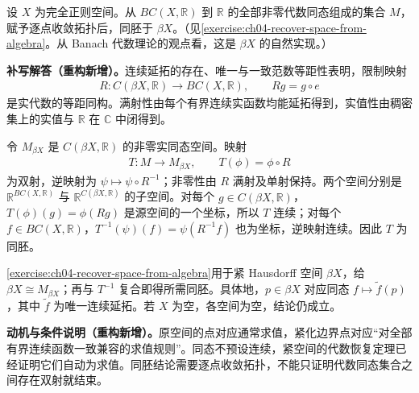 \documentclass[../../main.tex]{subfiles}
\begin{document}
\begin{exercise}\label{exercise:ch04-stone-cech-characters}
设 $X$ 为完全正则空间。从 $BC(X,\mathbb R)$ 到 $\mathbb R$ 的全部非零代数同态组成的集合 $M$，赋予逐点收敛拓扑后，同胚于 $\beta X$。（见\cref{exercise:ch04-recover-space-from-algebra}。从 Banach 代数理论的观点看，这是 $\beta X$ 的自然实现。）
\end{exercise}
\begin{solution}
\textbf{补写解答（重构新增）。}连续延拓的存在、唯一与一致范数等距性表明，限制映射
\begin{align*}
R:C(\beta X,\mathbb R)\longrightarrow BC(X,\mathbb R),
\qquad Rg=g\circ e
\end{align*}
是实代数的等距同构。满射性由每个有界连续实函数均能延拓得到，实值性由稠密集上的实值与 $\mathbb R$ 在 $\mathbb C$ 中闭得到。

令 $M_{\beta X}$ 是 $C(\beta X,\mathbb R)$ 的非零实同态空间。映射
\begin{align*}
T:M\to M_{\beta X},\qquad T(\phi)=\phi\circ R
\end{align*}
为双射，逆映射为 $\psi\mapsto\psi\circ R^{-1}$；非零性由 $R$ 满射及单射保持。两个空间分别是 $\mathbb R^{BC(X,\mathbb R)}$ 与 $\mathbb R^{C(\beta X,\mathbb R)}$ 的子空间。对每个 $g\in C(\beta X,\mathbb R)$，$T(\phi)(g)=\phi(Rg)$ 是源空间的一个坐标，所以 $T$ 连续；对每个 $f\in BC(X,\mathbb R)$，$T^{-1}(\psi)(f)=\psi(R^{-1}f)$ 也为坐标，逆映射连续。因此 $T$ 为同胚。

\cref{exercise:ch04-recover-space-from-algebra}用于紧 Hausdorff 空间 $\beta X$，给 $\beta X\cong M_{\beta X}$；再与 $T^{-1}$ 复合即得所需同胚。具体地，$p\in\beta X$ 对应同态 $f\mapsto\widetilde f(p)$，其中 $\widetilde f$ 为唯一连续延拓。若 $X$ 为空，各空间为空，结论仍成立。
\end{solution}
\begin{remark}
\textbf{动机与条件说明（重构新增）。}原空间的点对应通常求值，紧化边界点对应“对全部有界连续函数一致兼容的求值规则”。同态不预设连续，紧空间的代数恢复定理已经证明它们自动为求值。同胚结论需要逐点收敛拓扑，不能只证明代数同态集合之间存在双射就结束。
\end{remark}
\end{document}
